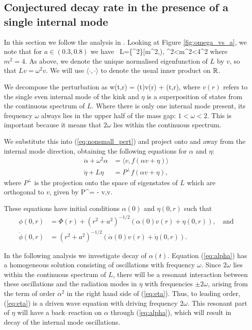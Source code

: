 \subsection{Conjectured decay rate in the presence of a single internal mode} \label{sec:conjecture}
In this section we follow the analysis in \cite{SG}. Looking at Figure \ref{fig:omega_vs_a}, we note that for $a\in(0.3,0.8)$ we have
\be \label{eq:spec_L}
\ L=\{\omega^2\}\cap [m^2,\infty), \qquad \omega^2<m^2<4\omega^2
\ee
where $m^2=4$. As above, we denote the unique normalised eigenfunction of $L$ by $v$, so that $Lv=\omega^2v$. We will use $\langle\cdot,\cdot\rangle$ to denote the usual inner product on $\mathbb{R}$.

We decompose the perturbation as
\be
w(t,r) = \alpha(t)v(r) + \eta(t,r),
\ee
where $v(r)$ refers to the single even internal mode of the kink and $\eta$ is a superposition of states from the continuous spectrum of $L$. Where there is only one internal mode present, its frequency $\omega$ always lies in the upper half of the mass gap: $1<\omega<2$. This is important because it means that $2\omega$ lies within the continuous spectrum.

We substitute this into (\ref{eq:nonsmall_pert}) and project onto and away from the internal mode direction, obtaining the following equations for $\alpha$ and $\eta$:
\begin{align}
\ddot{\alpha} + \omega^2\alpha &= \langle v, f(\alpha v + \eta) \rangle \label{eq:alpha}\\
\ddot{\eta} + L\eta &= P^\perp f(\alpha v + \eta),\label{eq:eta}
\end{align}
where $P^\perp$ is the projection onto the space of eigenstates of $L$ which are orthogonal to $v$, given by
\be \label{eq:Pperp}
P^\perp\psi = \psi - \langle v,\psi\rangle v.
\ee

These equations have initial conditions $\alpha(0)$ and $\eta(0,r)$ such that
\begin{align*}
\phi(0,r) &= \Phi(r) + (r^2+a^2)^{-1/2}(\alpha(0)v(r) + \eta(0,r)), \quad \mathrm{and} \\
\dot{\phi}(0,r) &= (r^2+a^2)^{-1/2}(\dot{\alpha}(0)v(r) + \dot{\eta}(0,r)).
\end{align*}

In the following analysis we investigate decay of $\alpha(t)$. Equation (\ref{eq:alpha}) has a homogeneous solution consisting of oscillations with frequency $\omega$. Since $2\omega$ lies within the continuous spectrum of $L$, there will be a resonant interaction between these oscillations and the radiation modes in $\eta$ with frequencies $\pm 2 \omega$, arising from the term of order $\alpha^2$ in the right hand side of (\ref{eq:eta}). Thus, to leading order, (\ref{eq:eta}) is a driven wave equation with driving frequency $2\omega$. This resonant part of $\eta$ will have a back--reaction on $\alpha$ through (\ref{eq:alpha}), which will result in decay of the internal mode oscillations.

